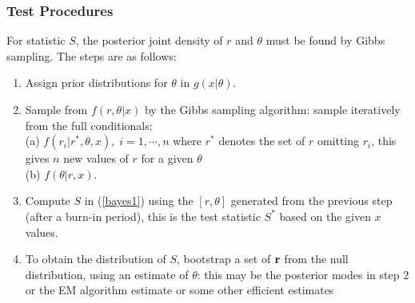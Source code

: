\documentclass{beamer}
\begin{document}
 
 \frame
{
  \frametitle{Test Procedures}
  
  
 For statistic $S$, %
 the posterior joint density of $r$ and $\theta$
 must be found by Gibbs sampling. 
The steps are as follows:
\begin{enumerate} 
\item
Assign prior distributions for 
$\theta$ in $g(x|\theta)$. 
\item
Sample from 
$f(r, \theta|x)$ by the Gibbs sampling algorithm:
sample iteratively from 
the full conditionals:  \\
(a) $f(r_i |r^*, \theta, x), \; i=1, \cdots, n$
where $r^*$ denotes the set of $r$ 
omitting $r_i$, this gives $n$ new 
values of $r$ for a given $\theta$\\
(b) $f(\theta |r , x)$. 
\item
Compute $S$ in (\ref{bayes1}) using
the $[r, \theta]$ generated from 
 the previous step (after a burn-in period), 
 this is the test statistic $S^*$ based on the 
 given $x$ values.
 \item
 To obtain the distribution of $S$,
 bootstrap a set of $\bold{r}$ from 
 the null distribution, using 
 an estimate of $\theta$: this may be
 the posterior modes in step 2 or 
 the EM algorithm estimate
 or some other efficient estimates 
 \end{enumerate}
}
\end{document}
